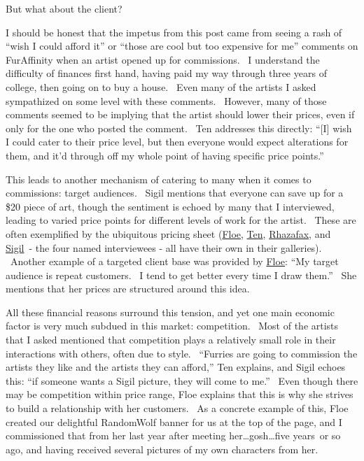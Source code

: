 But what about the client?

I should be honest that the impetus from this post came from seeing a
rash of ``wish I could afford it'' or ``those are cool but too expensive
for me'' comments on FurAffinity when an artist opened up for
commissions. ~I understand the difficulty of finances first hand, having
paid my way through three years of college, then going on to buy a
house. ~Even many of the artists I asked sympathized on some level with
these comments. ~However, many of those comments seemed to be implying
that the artist should lower their prices, even if only for the one who
posted the comment. ~Ten addresses this directly: ``{[}I{]} wish I could
cater to their price level, but then everyone would expect alterations
for them, and it'd through off my whole point of having specific price
points.''

This leads to another mechanism of catering to many when it comes to
commissions: target audiences. ~Sigil mentions that everyone can save up
for a \$20 piece of art, though the sentiment is echoed by many that I
interviewed, leading to varied price points for different levels of work
for the artist. ~These are often exemplified by the ubiquitous pricing
sheet (\href{http://www.furaffinity.net/view/8004380/}{Floe},
\href{http://www.furaffinity.net/view/8249974/}{Ten},
\href{http://www.furaffinity.net/view/5995209/}{Rhazafax}, and
\href{http://www.furaffinity.net/view/7145986/}{Sigil}~- the four named
interviewees - all have their own in their galleries). ~Another example
of a targeted client base was provided by
\href{http://www.furaffinity.net/user/floe}{Floe}: ``My target audience
is repeat customers. ~I tend to get better every time I draw them.''
~She mentions that her prices are structured around this idea.

All these financial reasons surround this tension, and yet one main
economic factor is very much subdued in this market: competition. ~Most
of the artists that I asked mentioned that competition plays a
relatively small role in their interactions with others, often due to
style. ~``Furries are going to commission the artists they like and the
artists they can afford,'' Ten explains, and Sigil echoes this: ``if
someone wants a Sigil picture, they will come to me.'' ~Even though
there may be competition within price range, Floe explains that this is
why she strives to build a relationship with her customers. ~As a
concrete example of this, Floe created our delightful RandomWolf banner
for us at the top of the page, and I commissioned that from her last
year after meeting her\ldots{}gosh\ldots{}five years~or so ago, and
having received several pictures of my own characters from her.

